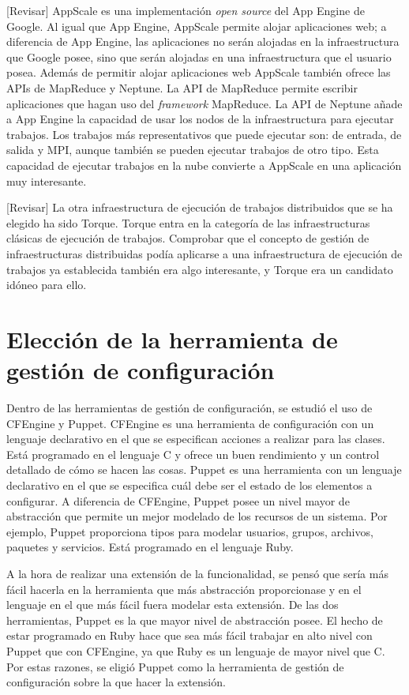 [Revisar]
AppScale es una implementación \emph{open source} del App Engine de Google. Al igual que App Engine, AppScale permite alojar aplicaciones web; a diferencia de App Engine, las aplicaciones no serán alojadas en la infraestructura que Google posee, sino que serán alojadas en una infraestructura que el usuario posea. Además de permitir alojar aplicaciones web AppScale también ofrece las APIs de MapReduce y Neptune. La API de MapReduce permite escribir aplicaciones que hagan uso del \emph{framework} MapReduce. La API de Neptune añade a App Engine la capacidad de usar los nodos de la infraestructura para ejecutar trabajos. Los trabajos más representativos que puede ejecutar son: de entrada, de salida y MPI, aunque también se pueden ejecutar trabajos de otro tipo. Esta capacidad de ejecutar trabajos en la nube convierte a AppScale en una aplicación muy interesante.

[Revisar]
La otra infraestructura de ejecución de trabajos distribuidos que se ha elegido ha sido Torque. Torque entra en la categoría de las infraestructuras clásicas de ejecución de trabajos. Comprobar que el concepto de gestión de infraestructuras distribuidas podía aplicarse a una infraestructura de ejecución de trabajos ya establecida también era algo interesante, y Torque era un candidato idóneo para ello.


\section{Elección de la herramienta de gestión de configuración}

Dentro de las herramientas de gestión de configuración, se estudió el uso de CFEngine y Puppet. CFEngine es una herramienta de configuración con un lenguaje declarativo en el que se especifican acciones a realizar para las clases. Está programado en el lenguaje C y ofrece un buen rendimiento y un control detallado de cómo se hacen las cosas. Puppet es una herramienta con un lenguaje declarativo en el que se especifica cuál debe ser el estado de los elementos a configurar. A diferencia de CFEngine, Puppet posee un nivel mayor de abstracción que permite un mejor modelado de los recursos de un sistema. Por ejemplo, Puppet proporciona tipos para modelar usuarios, grupos, archivos, paquetes y servicios. Está programado en el lenguaje Ruby.

A la hora de realizar una extensión de la funcionalidad, se pensó que sería más fácil hacerla en la herramienta que más abstracción proporcionase y en el lenguaje en el que más fácil fuera modelar esta extensión. De las dos herramientas, Puppet es la que mayor nivel de abstracción posee. El hecho de estar programado en Ruby hace que sea más fácil trabajar en alto nivel con Puppet que con CFEngine, ya que Ruby es un lenguaje de mayor nivel que C. Por estas razones, se eligió Puppet como la herramienta de gestión de configuración sobre la que hacer la extensión.


